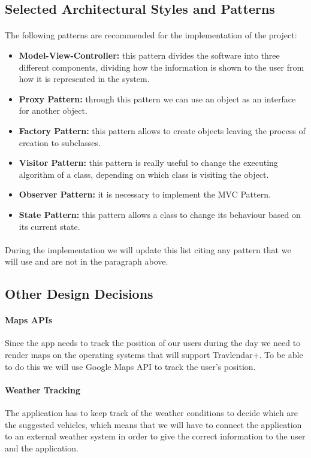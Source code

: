 \documentclass{article}
\begin{document}
		\subsection{Selected Architectural Styles and Patterns}
			\paragraph{} The following patterns are recommended for the implementation of the project:
				\begin{itemize}
				\item{} \textbf{Model-View-Controller: } this pattern divides the software into three different components, dividing how the information is shown to the user from how it is represented in the system.
				\item{} \textbf{Proxy Pattern: }through this pattern we can use an object as an interface for another object.
				\item{} \textbf{Factory Pattern: }this pattern allows to create objects leaving the process of creation to subclasses.
				\item{} \textbf{Visitor Pattern: }this pattern is really useful to change the executing algorithm of a class, depending on which class is visiting the object.
				\item{} \textbf{Observer Pattern: }it is necessary to implement the MVC Pattern.
				\item{} \textbf{State Pattern: }this pattern allows a class to change its behaviour based on its current state.
				\end{itemize}
			\paragraph{} During the implementation we will update this list citing any pattern that we will use and are not in the paragraph above.
		\newpage
		\subsection{Other Design Decisions}
			\paragraph{Maps APIs\\}
Since the app needs to track the position of our users during the day we need to render maps on the operating systems that will support Travlendar+. To be able to do this we will use Google Maps API to track the user’s position.
			\paragraph{Weather Tracking\\}
The application has to keep track of the weather conditions to decide which are the suggested vehicles, which means that we will have to connect the application to an external weather system in order to give the correct information to the user and the application.
		\newpage
\end{document}
